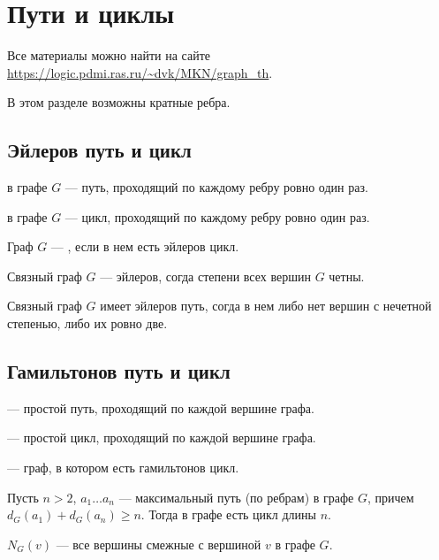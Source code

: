 \chapter{Пути и циклы} 

Все материалы можно найти на сайте \url{https://logic.pdmi.ras.ru/~dvk/MKN/graph_th}.
\begin{note}
    В этом разделе возможны кратные ребра.
\end{note}

\section{Эйлеров путь и цикл}

\begin{definition}[]

	 в графе $G$ --- путь, проходящий по каждому ребру ровно один раз. 
	
	 в графе $G$ --- цикл, проходящий по каждому ребру ровно один раз. 

	 Граф $G$ --- , если в нем есть эйлеров цикл.
\end{definition}

\begin{theorem}
	Связный граф $G$ --- эйлеров, согда степени всех вершин $G$ четны.
\end{theorem}
\begin{corollary}[]
	Связный граф $G$ имеет эйлеров путь, согда в нем либо нет вершин с нечетной степенью, либо их ровно две.
\end{corollary}

\section{Гамильтонов путь и цикл}

\begin{definition}[]
	 --- простой путь, проходящий по каждой вершине графа.

	 --- простой цикл, проходящий по каждой вершине графа.

	  --- граф, в котором есть гамильтонов цикл.
\end{definition}

\begin{lemma}\label{lm:circle_1}
    Пусть $n > 2$, $a_1 \ldots a_n$ --- максимальный путь (по ребрам) в графе $G$, причем $d_{G}(a_1) + d_{G}(a_{n}) \ge n$. Тогда в графе есть цикл длины $n$.
\end{lemma}
$N_G(v)$ --- все вершины смежные с вершиной $v$ в графе $G$.

